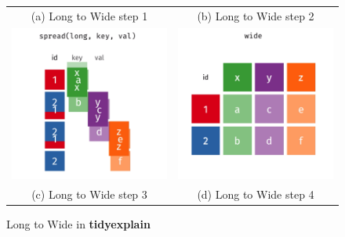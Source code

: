 \begin{figure}[H]
\begin{tabular}{cc}
    (a) Long to Wide step 1 & (b) Long to Wide step 2 \\[6pt]
     \includegraphics[scale = 0.25]{Masters-Thesis/img/tidyel2ws3.png} & \includegraphics[scale = 0.25]{Masters-Thesis/img/tidyel2ws4.png} \\
    (c) Long to Wide step 3 & (d) Long to Wide step 4 \\[6pt]
    \end{tabular}
    \caption{Long to Wide in \textbf{tidyexplain}}
    \label{fig:tidyel2w}
\end{figure}
